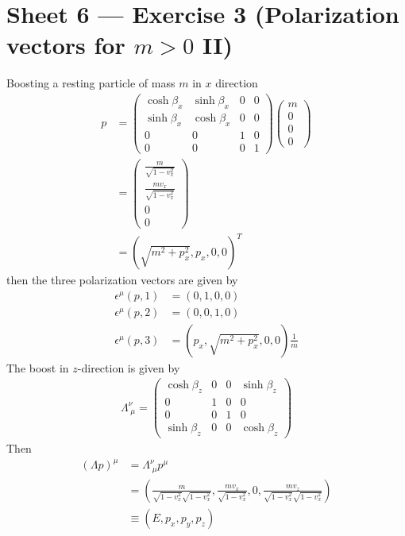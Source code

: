 \documentclass[10pt,a4paper]{report}
\theoremstyle{definition}
\begin{document}
\section{Sheet 6 — Exercise 3 (Polarization vectors for $m>0$ II)}
Boosting a resting particle of mass $m$ in $x$ direction 
\begin{align}
p&=\left(
\begin{array}{cccc}
\cosh\beta_x & \sinh\beta_x & 0 & 0 \\
\sinh\beta_x & \cosh\beta_x & 0 & 0 \\
0 & 0 & 1 & 0 \\
0 & 0 & 0 & 1
\end{array}
\right)
\left(
\begin{array}{c}
m  \\
0  \\
0  \\
0 
\end{array}
\right)
\\
&=\left(
\begin{array}{c}
\frac{m}{\sqrt{1-v_x^2}}  \\
\frac{mv_x}{\sqrt{1-v_x^2}}  \\
0  \\
0 
\end{array}
\right)\\
&=(\sqrt{m^2+p_x^2},p_x,0,0)^T
\end{align}
then the three polarization vectors are given by
\begin{align}
\epsilon^\mu(p,1)&=(0,1,0,0)\\
\epsilon^\mu(p,2)&=(0,0,1,0)\\
\epsilon^\mu(p,3)&=(p_x,\sqrt{m^2+p_x^2},0,0)\frac{1}{m}
\end{align}
The boost in $z$-direction is given by
\begin{align}
\Lambda^\nu_{\;\mu}=
\left(
\begin{array}{cccc}
\cosh\beta_z & 0 & 0 & \sinh\beta_z \\
0 & 1 & 0 & 0 \\
0 & 0 & 1 & 0 \\
\sinh\beta_z & 0 & 0 & \cosh\beta_z
\end{array}
\right)
\end{align}
Then
\begin{align}
(\Lambda p)^\mu
&=\Lambda^\nu_{\;\mu} p^\mu\\
&=\left(\frac{m}{\sqrt{1-v_x^2}\sqrt{1-v_x^2}},\frac{mv_x}{\sqrt{1-v_x^2}},0,\frac{mv_z}{\sqrt{1-v_x^2}\sqrt{1-v_x^2}}\right)\\
&\equiv(E,p_x,p_y,p_z)
\end{align}
\end{document}
